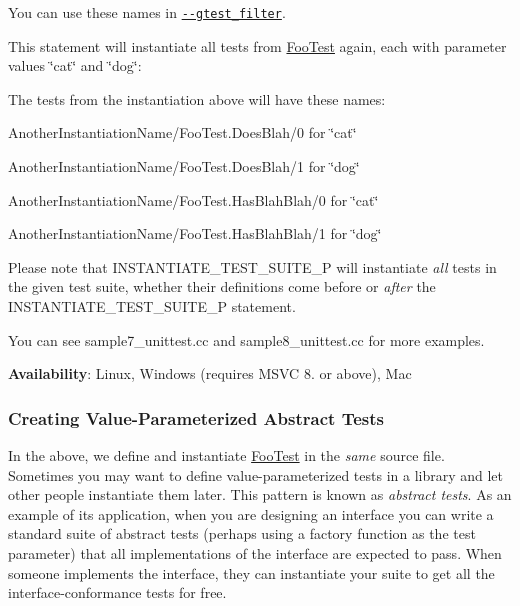 You can use these names in \href{\#running-a-subset-of-the-tests}{\texttt{ {\ttfamily -\/-\/gtest\+\_\+filter}}}.

This statement will instantiate all tests from {\ttfamily \mbox{\hyperlink{class_foo_test}{Foo\+Test}}} again, each with parameter values {\ttfamily \char`\"{}cat\char`\"{}} and {\ttfamily \char`\"{}dog\char`\"{}}\+:


\begin{DoxyCode}{0}
\end{DoxyCode}


The tests from the instantiation above will have these names\+:


\begin{DoxyItemize}
\item {\ttfamily Another\+Instantiation\+Name/\+Foo\+Test.\+Does\+Blah/0} for {\ttfamily \char`\"{}cat\char`\"{}}
\item {\ttfamily Another\+Instantiation\+Name/\+Foo\+Test.\+Does\+Blah/1} for {\ttfamily \char`\"{}dog\char`\"{}}
\item {\ttfamily Another\+Instantiation\+Name/\+Foo\+Test.\+Has\+Blah\+Blah/0} for {\ttfamily \char`\"{}cat\char`\"{}}
\item {\ttfamily Another\+Instantiation\+Name/\+Foo\+Test.\+Has\+Blah\+Blah/1} for {\ttfamily \char`\"{}dog\char`\"{}}
\end{DoxyItemize}

Please note that {\ttfamily I\+N\+S\+T\+A\+N\+T\+I\+A\+T\+E\+\_\+\+T\+E\+S\+T\+\_\+\+S\+U\+I\+T\+E\+\_\+P} will instantiate {\itshape all} tests in the given test suite, whether their definitions come before or {\itshape after} the {\ttfamily I\+N\+S\+T\+A\+N\+T\+I\+A\+T\+E\+\_\+\+T\+E\+S\+T\+\_\+\+S\+U\+I\+T\+E\+\_\+P} statement.

You can see sample7\+\_\+unittest.\+cc and sample8\+\_\+unittest.\+cc for more examples.

{\bfseries{Availability}}\+: Linux, Windows (requires M\+S\+VC 8. or above), Mac

\subsubsection*{Creating Value-\/\+Parameterized Abstract Tests}

In the above, we define and instantiate {\ttfamily \mbox{\hyperlink{class_foo_test}{Foo\+Test}}} in the {\itshape same} source file. Sometimes you may want to define value-\/parameterized tests in a library and let other people instantiate them later. This pattern is known as {\itshape abstract tests}. As an example of its application, when you are designing an interface you can write a standard suite of abstract tests (perhaps using a factory function as the test parameter) that all implementations of the interface are expected to pass. When someone implements the interface, they can instantiate your suite to get all the interface-\/conformance tests for free.

